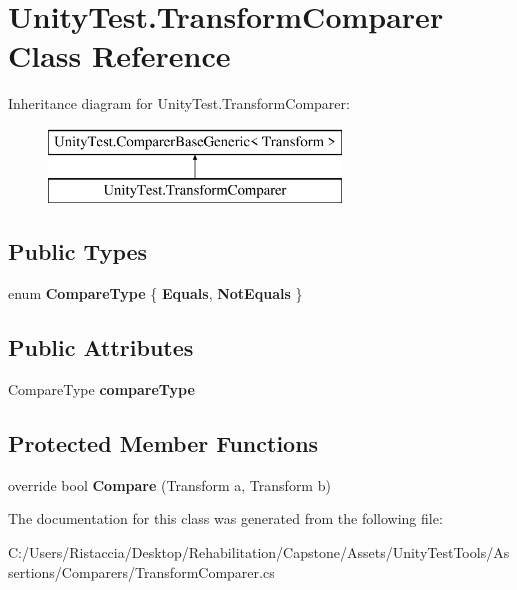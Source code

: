 \hypertarget{class_unity_test_1_1_transform_comparer}{}\section{Unity\+Test.\+Transform\+Comparer Class Reference}
\label{class_unity_test_1_1_transform_comparer}
Inheritance diagram for Unity\+Test.\+Transform\+Comparer\+:\begin{figure}[H]
\begin{center}
\leavevmode
\includegraphics[height=2.000000cm]{class_unity_test_1_1_transform_comparer}
\end{center}
\end{figure}
\subsection*{Public Types}
\begin{DoxyCompactItemize}
\item 
\mbox{\label{class_unity_test_1_1_transform_comparer_afd563c7c0bb0e992b94588d48249d47c}} 
enum {\bfseries Compare\+Type} \{ {\bfseries Equals}, 
{\bfseries Not\+Equals}
 \}
\end{DoxyCompactItemize}
\subsection*{Public Attributes}
\begin{DoxyCompactItemize}
\item 
\mbox{\label{class_unity_test_1_1_transform_comparer_a2f5cf379be0f8f795f833bb8bb879f61}} 
Compare\+Type {\bfseries compare\+Type}
\end{DoxyCompactItemize}
\subsection*{Protected Member Functions}
\begin{DoxyCompactItemize}
\item 
\mbox{\label{class_unity_test_1_1_transform_comparer_a92b79080826fa066186c6365dc083a32}} 
override bool {\bfseries Compare} (Transform a, Transform b)
\end{DoxyCompactItemize}


The documentation for this class was generated from the following file\+:\begin{DoxyCompactItemize}
\item 
C\+:/\+Users/\+Ristaccia/\+Desktop/\+Rehabilitation/\+Capstone/\+Assets/\+Unity\+Test\+Tools/\+Assertions/\+Comparers/Transform\+Comparer.\+cs\end{DoxyCompactItemize}
